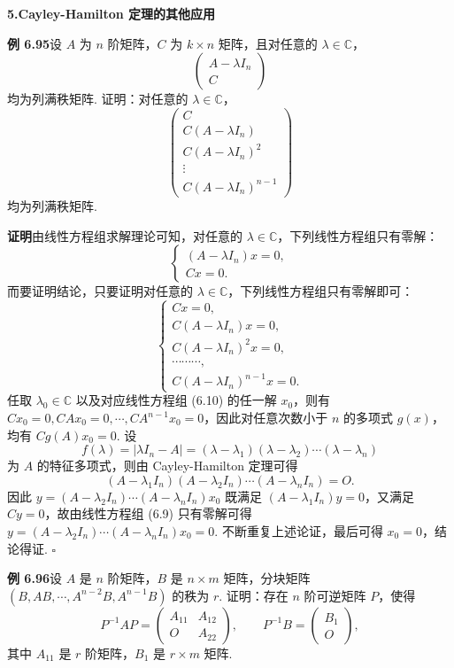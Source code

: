 \documentclass[UTF8, 12pt, fontset=fandol, oneside]{ctexart}
\begin{document}
\noindent\textbf{5.\quad Cayley-Hamilton 定理的其他应用}

\noindent\textbf{例 6.95}\quad 设 $A$ 为 $n$ 阶矩阵，$C$ 为 $k\times n$ 矩阵，且对任意的 $\lambda\in\mathbb{C}$，
\[
\begin{pmatrix} A-\lambda I_n\\ C\end{pmatrix}
\]
均为列满秩矩阵. 证明：对任意的 $\lambda\in\mathbb{C}$，
\[
\begin{pmatrix}
C\\
C(A-\lambda I_n)\\
C(A-\lambda I_n)^2\\
\vdots\\
C(A-\lambda I_n)^{n-1}
\end{pmatrix}
\]
均为列满秩矩阵.

\noindent\textbf{证明}\quad 由线性方程组求解理论可知，对任意的 $\lambda\in\mathbb{C}$，下列线性方程组只有零解：
\begin{equation}
\begin{cases}
(A-\lambda I_n)x=0,\\
Cx=0.
\end{cases} \tag{6.9}
\end{equation}
而要证明结论，只要证明对任意的 $\lambda\in\mathbb{C}$，下列线性方程组只有零解即可：
\begin{equation}
\begin{cases}
Cx=0,\\
C(A-\lambda I_n)x=0,\\
C(A-\lambda I_n)^2x=0,\\
\cdots\cdots\cdots,\\
C(A-\lambda I_n)^{n-1}x=0.
\end{cases} \tag{6.10}
\end{equation}
任取 $\lambda_0\in\mathbb{C}$ 以及对应线性方程组 (6.10) 的任一解 $x_0$，则有 $Cx_0=0,CAx_0=0,\cdots,CA^{n-1}x_0=0$，因此对任意次数小于 $n$ 的多项式 $g(x)$，均有 $Cg(A)x_0=0$. 设
\[
f(\lambda)=|\lambda I_n-A|=(\lambda-\lambda_1)(\lambda-\lambda_2)\cdots(\lambda-\lambda_n)
\]
为 $A$ 的特征多项式，则由 Cayley-Hamilton 定理可得
\[
(A-\lambda_1I_n)(A-\lambda_2I_n)\cdots(A-\lambda_nI_n)=O.
\]
因此 $y=(A-\lambda_2I_n)\cdots(A-\lambda_nI_n)x_0$ 既满足 $(A-\lambda_1I_n)y=0$，又满足 $Cy=0$，故由线性方程组 (6.9) 只有零解可得 $y=(A-\lambda_2I_n)\cdots(A-\lambda_nI_n)x_0=0$. 不断重复上述论证，最后可得 $x_0=0$，结论得证. $\square$

\noindent\textbf{例 6.96}\quad 设 $A$ 是 $n$ 阶矩阵，$B$ 是 $n\times m$ 矩阵，分块矩阵 $(B,AB,\cdots,A^{n-2}B,A^{n-1}B)$ 的秩为 $r$. 证明：存在 $n$ 阶可逆矩阵 $P$，使得
\[
P^{-1}AP=\begin{pmatrix} A_{11}&A_{12}\\ O&A_{22}\end{pmatrix},\qquad
P^{-1}B=\begin{pmatrix} B_1\\ O\end{pmatrix},
\]
其中 $A_{11}$ 是 $r$ 阶矩阵，$B_1$ 是 $r\times m$ 矩阵.
\end{document}
